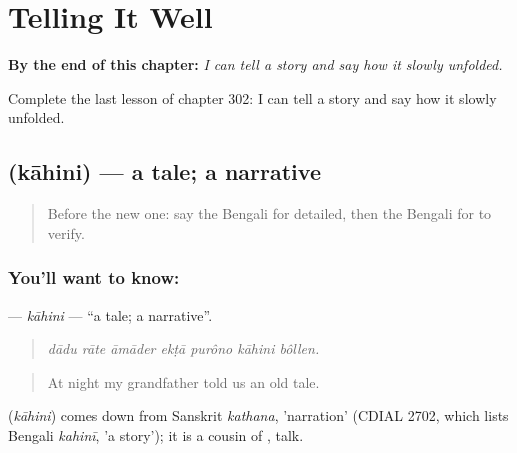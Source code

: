
\chapter{Telling It Well}
\label{ch:bn-telling-it-well}

\begin{chapteropening}
\textbf{By the end of this chapter:} \emph{I can tell a story and say how it slowly unfolded.}

Complete the last lesson of chapter 302: I can tell a story and say how it slowly unfolded.
\end{chapteropening}

\section[\texorpdfstring{\bn{কাহিনি} (kāhini)}{কাহিনি (kāhini)}]{ (kāhini) — a tale; a narrative}

\label{lesson:BN-C302-kahini}



\begin{quote}
Before the new one: say the Bengali for detailed, then the Bengali for to verify.
\end{quote}

\subsection*{You'll want to know: }
\textbf{} — \emph{kāhini} — \textquotedblleft{}a tale; a narrative\textquotedblright{}.

\begin{quote}
      
\end{quote}

\begin{quote}
\emph{dādu rāte āmāder ekṭā purôno kāhini bôllen.}
\end{quote}

\begin{quote}
At night my grandfather told us an old tale.
\end{quote}

\begin{cousinweb}
\textbf{} (\emph{kāhini}) comes down from Sanskrit \emph{kathana}, 'narration' (CDIAL 2702, which lists Bengali \emph{kahinī}, 'a story'); it is a cousin of \textbf{}, talk.
\end{cousinweb}

